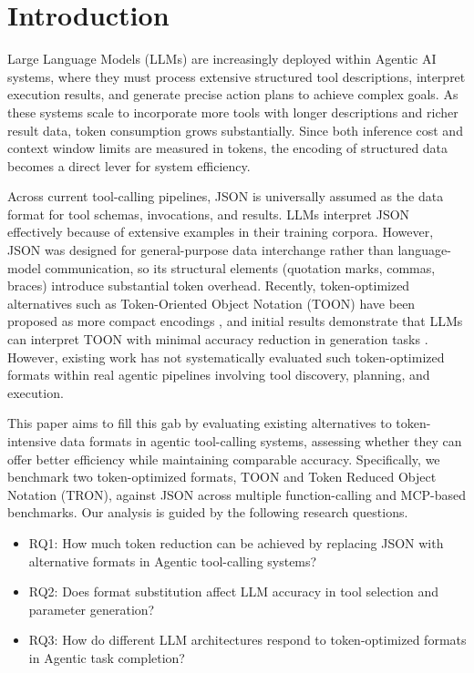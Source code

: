 \documentclass[11pt]{article}
\begin{document}
\section{Introduction}
\label{sec:introduction}
Large Language Models (LLMs) are increasingly deployed within Agentic AI systems, where they must process extensive structured tool descriptions, interpret execution results, and generate precise action plans to achieve complex goals. As these systems scale to incorporate more tools with longer descriptions and richer result data, token consumption grows substantially. Since both inference cost and context window limits are measured in tokens, the encoding of structured data becomes a direct lever for system efficiency.

Across current tool-calling pipelines, JSON is universally assumed as the data format for tool schemas, invocations, and results. LLMs interpret JSON effectively because of extensive examples in their training corpora. However, JSON was designed for general-purpose data interchange rather than language-model communication, so its structural elements (quotation marks, commas, braces) introduce substantial token overhead. Recently, token-optimized alternatives such as Token-Oriented Object Notation (TOON) have been proposed as more compact encodings \citep{Lafalce_2025}, and initial results demonstrate that LLMs can interpret TOON with minimal accuracy reduction in generation tasks \citep{Masciari_Moscato_Napolitano_Orlando_Perillo_Russo_2026}. However, existing work has not systematically evaluated such token-optimized formats within real agentic pipelines involving tool discovery, planning, and execution.

This paper aims to fill this gab by evaluating existing alternatives to token-intensive data formats in agentic tool-calling systems, assessing whether they can offer better efficiency while maintaining comparable accuracy.
Specifically, we benchmark two token-optimized formats, TOON and Token Reduced Object Notation (TRON), against JSON across multiple function-calling and MCP-based benchmarks. Our analysis is guided by the following research questions.
\begin{itemize}
    \item RQ1: How much token reduction can be achieved by replacing JSON with alternative formats in Agentic tool-calling systems?
    \item RQ2: Does format substitution affect LLM accuracy in tool selection and parameter generation?
    \item RQ3: How do different LLM architectures respond to token-optimized formats in Agentic task completion?
\end{itemize}
\end{document}
